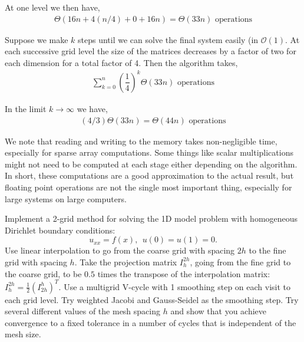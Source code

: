 \documentclass[10pt]{article}
\begin{document}
\begin{solution}[Solution]
\begin{enumerate}[label=(\alph*)]
        At one level we then have,
        \begin{align*}
            \Theta( 16n + 4(n/4) + 0 + 16n ) = \Theta( 33n ) \text{ operations}
        \end{align*}

        Suppose we make \( k \) steps until we can solve the final system easily (in \( \mathcal{O} (1) \). At each successive grid level the size of the matrices decreases by a factor of two for each dimension for a total factor of 4. Then the algorithm takes,
        \begin{align*}
            \sum_{k=0}^{n} \left( \dfrac{1}{4} \right)^k \Theta(33 n) \text{ operations}
        \end{align*}
        
        In the limit \( k\to \infty \) we have,
        \begin{align*}
            (4/3) \Theta(33 n) = \Theta(44n) \text{ operations}
        \end{align*}
        
        

        We note that reading and writing to the memory takes non-negligible time, especially for sparse array computations. Some things like scalar multiplications might not need to be computed at each stage either depending on the algorithm. In short, these computations are a good approximation to the actual result, but floating point operations are not the single most important thing, especially for large systems on large computers.

\end{enumerate}

\end{solution}

\begin{problem}[Problem 2]
Implement a 2-grid method for solving the 1D model problem with homogeneous Dirichlet boundary conditions:
\[
u_{xx} = f(x) ,~~u(0) = u(1) = 0.
\]
Use linear interpolation to go from the coarse grid with spacing \( 2h \) to the fine grid with spacing \( h \).  Take the projection matrix \( I_h^{2h} \), going from the fine grid to the coarse grid, to be \( 0.5 \) times the transpose of the interpolation matrix: \( I_h^{2h} = \frac{1}{2} ( I_{2h}^h )^T \). Use a multigrid V-cycle with 1 smoothing step on each visit to each grid level. Try weighted Jacobi and Gauss-Seidel as the smoothing step. Try several different values of the mesh spacing \( h \) and show that you achieve convergence to a fixed tolerance in a number of cycles that is independent of the mesh size.
\end{problem}
\end{document}
